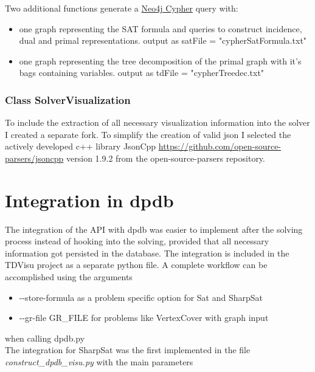 \documentclass[a4paper, 12pt]{scrartcl}
\begin{document}
Two additional functions generate a \href{https://neo4j.com/docs/cypher-refcard/current/}{Neo4j Cypher} query with:
\begin{itemize}
	\item one graph representing the SAT formula and  queries to construct incidence, dual and primal representations.
	output as satFile = "cypherSatFormula.txt"
	\item one graph representing the tree decomposition of the primal graph with it's bags containing variables.
	output as tdFile = "cypherTreedec.txt"
\end{itemize}

\subsubsection{Class SolverVisualization}

To include the extraction of all necessary visualization information into the solver I created a separate fork.
To simplify the creation of valid json I selected the actively developed c++ library JsonCpp \url{https://github.com/open-source-parsers/jsoncpp} version 1.9.2 from the open-source-parsers repository.

\newpage
\section{Integration in dpdb}
The integration of the API with dpdb was easier to implement after the solving process instead of
hooking into the solving, 
provided that all necessary information got persisted in the database.
The integration is included in the TDVisu project as a separate python file.
A complete workflow can be accomplished using the arguments
\begin{itemize}
	\item -{}-store-formula as a problem specific option for Sat and SharpSat
	\item -{}-gr-file GR\_FILE for problems like VertexCover with graph input 
\end{itemize}
when calling dpdb.py\\
The integration for SharpSat was the first implemented in the file \textit{construct\_dpdb\_visu.py} with
the main parameters
\end{document}
